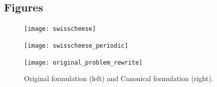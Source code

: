 \documentclass{bmcart}
\begin{document}
\begin{backmatter}





% 
\section*{Figures}
\begin{figure}[h!]
\centering
\texttt{[image: swisscheese]}
\caption{\label{fig:swisscheese}}
\end{figure}

\begin{figure}[htb]
\centering
\texttt{[image: swisscheese\_periodic]}
\caption{\label{fig:swisscheese_periodic}}
\end{figure}

\begin{figure}[!htpb]
 \centering
 \texttt{[image: original\_problem\_rewrite]}
 \caption{
   Original formulation (left) and Canonical formulation (right).\label{fig:format_comparison}}
\end{figure}


\end{backmatter}
\end{document}
